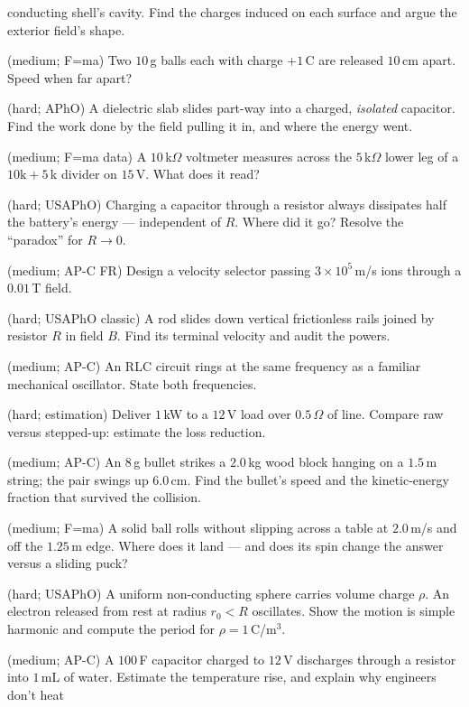 \begin{description}
conducting shell's cavity. Find the charges induced on each surface
and argue the exterior field's shape.
\item[W13] (medium; F=ma) Two $10$\,g balls each with charge
$+1$\,\textmu C are released $10$\,cm apart. Speed when far apart?
\item[W14] (hard; APhO) A dielectric slab slides part-way into a
charged, \emph{isolated} capacitor. Find the work done by the field
pulling it in, and where the energy went.
\item[W15] (medium; F=ma data) A $10$\,k$\Omega$ voltmeter measures
across the $5$\,k$\Omega$ lower leg of a $10\text{k}\!+\!5$\,k divider
on $15$\,V. What does it read?
\item[W16] (hard; USAPhO) Charging a capacitor through a resistor
always dissipates half the battery's energy --- independent of $R$.
Where did it go? Resolve the ``paradox'' for $R\to0$.
\item[W17] (medium; AP-C FR) Design a velocity selector passing
$3\times10^{5}$\,m/s ions through a $0.01$\,T field.
\item[W18] (hard; USAPhO classic) A rod slides down vertical
frictionless rails joined by resistor $R$ in field $B$. Find its
terminal velocity and audit the powers.
\item[W19] (medium; AP-C) An RLC circuit rings at the same frequency as
a familiar mechanical oscillator. State both frequencies.
\item[W20] (hard; estimation) Deliver $1$\,kW to a $12$\,V load over
$0.5\,\Omega$ of line. Compare raw versus stepped-up:
estimate the loss reduction.
\item[W21] (medium; AP-C) An $8$\,g bullet strikes a $2.0$\,kg wood
block hanging on a $1.5$\,m string; the pair swings up $6.0$\,cm.
Find the bullet's speed and the kinetic-energy fraction that survived
the collision.
\item[W22] (medium; F=ma) A solid ball rolls without slipping across a
table at $2.0$\,m/s and off the $1.25$\,m edge. Where does it land
--- and does its spin change the answer versus a sliding puck?
\item[W23] (hard; USAPhO) A uniform non-conducting sphere carries
volume charge $\rho$. An electron released from rest at radius
$r_0<R$ oscillates. Show the motion is simple harmonic and compute the
period for $\rho=1$\,\textmu C/m$^{3}$.
\item[W24] (medium; AP-C) A $100$\,\textmu F capacitor charged to
$12$\,V discharges through a resistor into $1$\,mL of water.
Estimate the temperature rise, and explain why engineers don't heat

\end{description}
